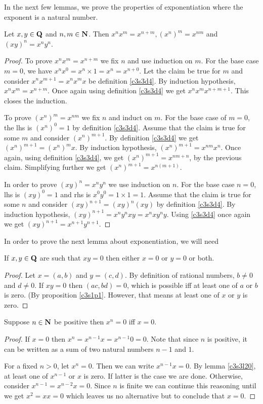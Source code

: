 In the next few lemmas, we prove the properties of exponentiation where
the exponent is a natural number.
\begin{lem}\label{c3s3l19}
Let $x, y \in \mathbf{Q}$ and $n, m \in \mathbf{N}$. Then $x^n x^m = x^{n + m}, 
(x^n)^m = x^{nm}$ and $(xy)^n = x^n y^n$.
\end{lem}
\begin{proof}
To prove $x^n x^m = x^{n + m}$ we fix $n$ and use induction on $m$. For the
base case $m = 0$, we have $x^n x^0 = x^n \times 1 = x^n = x^{n + 0}$. Let
the claim be true for $m$ and consider $x^n x^{m+1} = x^n x^m x$ be 
definition \ref{c3s3d4}. By induction hypothesis, $x^n x^m = x^{n+m}$. Once
again using definition \ref{c3s3d4} we get $x^n x^m x^{n+m+1}$. This closes
the induction.

To prove $(x^n)^m = x^{nm}$ we fix $n$ and induct on $m$. For the base
case of $m = 0$, the lhs is $(x^n)^0 = 1$ by definition \ref{c3s3d4}. 
Assume that the claim is true for some $m$ and consider $(x^n)^{m+1}$. By
definition \ref{c3s3d4} we get $(x^n)^{m+1} = (x^n)^m x$. By induction 
hypothesis, $(x^n)^{m+1} = x^{nm}x^n$. Once again, using definition 
\ref{c3s3d4}, we get $(x^n)^{m+1} = x^{nm+n}$, by the previous claim.
Simplifying further we get $(x^n)^{m+1} = x^{n(m+1)}$.

In order to prove $(xy)^n = x^n y^n$ we use induction on $n$. For the
base case $n = 0$, lhs is $(xy)^0 = 1$ and rhs is $x^0 y^0 = 1 \times 1 = 
1$. Assume that the claim is true for some $n$ and consider $(xy)^{n+1} =
(xy)^n (xy)$ by definition \ref{c3s3d4}. By induction hypothesis, 
$(xy)^{n+1} = x^ny^n xy = x^n x y^n y$. Using \ref{c3s3d4} once again
we get $(xy)^{n+1} = x^{n+1} y^{n+1}$.
\end{proof}

In order to prove the next lemma about exponentiation, we will need
\begin{lem}\label{c3s3l20}
If $x, y \in \mathbf{Q}$ are such that $xy = 0$ then either $x = 0$ or $y = 0$
or both.
\end{lem}
\begin{proof}
Let $x = (a, b)$ and $y = (c, d)$. By definition of rational numbers, $b
\ne 0$ and $d \ne 0$. If $xy = 0$ then $(ac, bd) = 0$, which is possible 
iff at least one of $a$ or $b$ is zero. (By proposition \ref{c3s1p1}. 
However, that means at least one of $x$ or $y$ is zero.
\end{proof}

\begin{lem}\label{c3s3l21}
Suppose $n \in \mathbf{N}$ be positive then $x^n = 0$ iff $x = 0$.
\end{lem}
\begin{proof}
If $x = 0$ then $x^n = x^{n-1}x = x^{n-1}0 = 0$. Note that since $n$ is
positive, it can be written as a sum of two natural numbers $n-1$ and $1$.

For a fixed $n > 0$, let $x^n = 0$. Then we can write $x^{n-1}x = 0$. By
lemma \ref{c3s3l20}, at least one of $x^{n-1}$ or $x$ is zero. If latter
is the case we are done. Otherwise, consider $x^{n-1} = x^{n-2}x = 0$. 
Since $n$ is finite we can continue this reasoning until we get $x^2 = xx
= 0$ which leaves us no alternative but to conclude that $x = 0$.
\end{proof}


